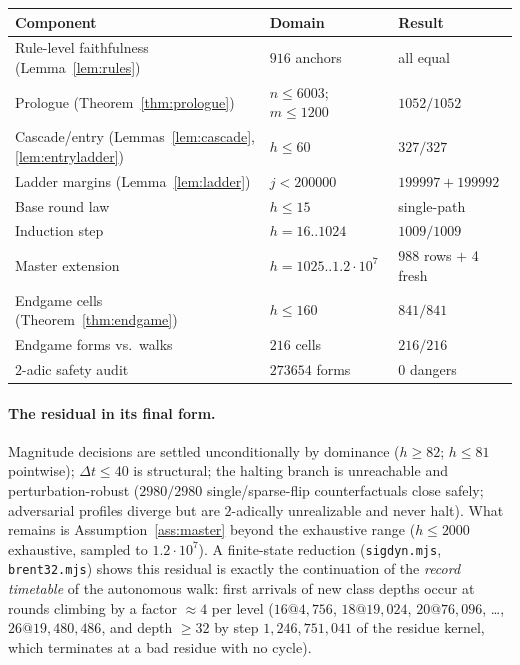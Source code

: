 \documentclass[11pt]{amsart}
\theoremstyle{definition}
\begin{document}
\begin{center}
\begin{tabular}{lll}
\toprule
Component & Domain & Result\\
\midrule
Rule-level faithfulness (Lemma~\ref{lem:rules}) & $916$ anchors & all equal\\
Prologue (Theorem~\ref{thm:prologue}) & $n\le6003$; $m\le1200$ & $1052/1052$\\
Cascade/entry (Lemmas~\ref{lem:cascade},\ref{lem:entryladder}) & $h\le60$ & $327/327$\\
Ladder margins (Lemma~\ref{lem:ladder}) & $j<200000$ & $199997{+}199992$\\
Base round law & $h\le15$ & single-path\\
Induction step & $h=16..1024$ & $1009/1009$\\
Master extension & $h=1025..1.2\cdot10^{7}$ & $988$ rows $+$ 4 fresh\\
Endgame cells (Theorem~\ref{thm:endgame}) & $h\le160$ & $841/841$\\
Endgame forms vs.\ walks & $216$ cells & $216/216$\\
$2$-adic safety audit & $273654$ forms & $0$ dangers\\
\bottomrule
\end{tabular}
\end{center}

\paragraph{The residual in its final form.}
Magnitude decisions are settled unconditionally by dominance ($h\ge82$;
$h\le81$ pointwise); $\Delta t\le40$ is structural; the halting branch is
unreachable and perturbation-robust ($2980/2980$ single/sparse-flip
counterfactuals close safely; adversarial profiles diverge but are
$2$-adically unrealizable and never halt). What remains is
Assumption~\ref{ass:master} beyond the exhaustive range ($h\le2000$
exhaustive, sampled to $1.2\cdot10^{7}$). A finite-state reduction
(\texttt{sigdyn.mjs}, \texttt{brent32.mjs}) shows this residual is exactly
the continuation of the \emph{record timetable} of the autonomous walk:
first arrivals of new class depths occur at rounds climbing by a factor
$\approx4$ per level ($16@4{,}756$, $18@19{,}024$, $20@76{,}096$, \dots,
$26@19{,}480{,}486$, and depth $\ge32$ by step $1{,}246{,}751{,}041$ of the
residue kernel, which terminates at a bad residue with no cycle).
\end{document}
